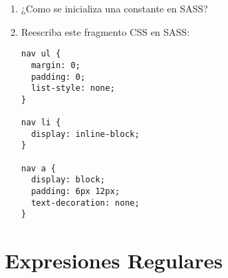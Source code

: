 \documentclass[spanish,a4paper,11pt]{article}
\begin{document}
\begin{enumerate}
\item 
¿Como se inicializa una constante en SASS?
% 
\item 
Reescriba este fragmento CSS en SASS:
\begin{verbatim}
nav ul {
  margin: 0;
  padding: 0;
  list-style: none;
}

nav li {
  display: inline-block;
}

nav a {
  display: block;
  padding: 6px 12px;
  text-decoration: none;
}
\end{verbatim}
\end{enumerate}

\section{Expresiones Regulares}
\end{document}
